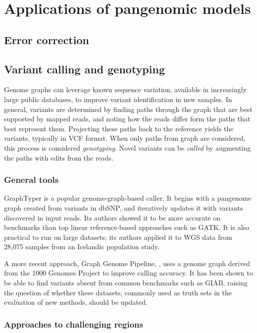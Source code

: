\section{Applications of pangenomic models}

\subsection{Error correction}

\subsection{Variant calling and genotyping}

Genome graphs can leverage known sequence variation, available in increasingly large public databases, to improve variant identification in new samples.
In general, variants are determined by finding paths through the graph that are best supported by mapped reads, and noting how the reads differ form the paths that best represent them.
Projecting these paths back to the reference yields the variants, typically in VCF format.
When only paths from graph are considered, this process is considered \emph{genotyping}.
Novel variants can be \emph{called} by augmenting the paths with edits from the reads.

\subsubsection{General tools}

GraphTyper \cite{eggertsson2017graphtyper} is a popular genome-graph-based caller.
It begins with a pangenome graph created from variants in dbSNP, and iteratively updates it with variants discovered in input reads.
Its authors showed it to be more accurate on benchmarks than top linear reference-based approaches such as GATK.
It is also practical to run on large datasets; its authors applied it to WGS data from 28,075 samples from an Icelandic population study.

A more recent approach, Graph Genome Pipeline, \cite{Rakocevic_2019}, uses a genome graph derived from the 1000 Genomes Project to improve calling accuracy.
It has been shown to be able to find variants absent from common benchmarks such as GIAB, raising the question of whether these datasets, commonly used as truth sets in the evaluation of new methods, should be updated.

\subsubsection{Approaches to challenging regions}

